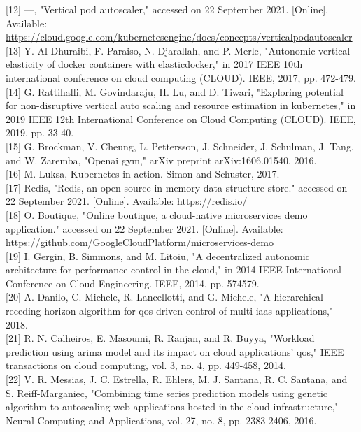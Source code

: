 \documentclass[10pt]{article}
\begin{document}
[12] —, "Vertical pod autoscaler," accessed on 22 September 2021. [Online]. Available: \href{https://cloud.google.com/kubernetesengine/docs/concepts/verticalpodautoscaler}{https://cloud.google.com/kubernetesengine/docs/concepts/verticalpodautoscaler}\\[0pt]
[13] Y. Al-Dhuraibi, F. Paraiso, N. Djarallah, and P. Merle, "Autonomic vertical elasticity of docker containers with elasticdocker," in 2017 IEEE 10th international conference on cloud computing (CLOUD). IEEE, 2017, pp. 472-479.\\[0pt]
[14] G. Rattihalli, M. Govindaraju, H. Lu, and D. Tiwari, "Exploring potential for non-disruptive vertical auto scaling and resource estimation in kubernetes," in 2019 IEEE 12th International Conference on Cloud Computing (CLOUD). IEEE, 2019, pp. 33-40.\\[0pt]
[15] G. Brockman, V. Cheung, L. Pettersson, J. Schneider, J. Schulman, J. Tang, and W. Zaremba, "Openai gym," arXiv preprint arXiv:1606.01540, 2016.\\[0pt]
[16] M. Luksa, Kubernetes in action. Simon and Schuster, 2017.\\[0pt]
[17] Redis, "Redis, an open source in-memory data structure store." accessed on 22 September 2021. [Online]. Available: \href{https://redis.io/}{https://redis.io/}\\[0pt]
[18] O. Boutique, "Online boutique, a cloud-native microservices demo application." accessed on 22 September 2021. [Online]. Available: \href{https://github.com/GoogleCloudPlatform/microservices-demo}{https://github.com/GoogleCloudPlatform/microservices-demo}\\[0pt]
[19] I. Gergin, B. Simmons, and M. Litoiu, "A decentralized autonomic architecture for performance control in the cloud," in 2014 IEEE International Conference on Cloud Engineering. IEEE, 2014, pp. 574579.\\[0pt]
[20] A. Danilo, C. Michele, R. Lancellotti, and G. Michele, "A hierarchical receding horizon algorithm for qos-driven control of multi-iaas applications," 2018.\\[0pt]
[21] R. N. Calheiros, E. Masoumi, R. Ranjan, and R. Buyya, "Workload prediction using arima model and its impact on cloud applications' qos," IEEE transactions on cloud computing, vol. 3, no. 4, pp. 449-458, 2014.\\[0pt]
[22] V. R. Messias, J. C. Estrella, R. Ehlers, M. J. Santana, R. C. Santana, and S. Reiff-Marganiec, "Combining time series prediction models using genetic algorithm to autoscaling web applications hosted in the cloud infrastructure," Neural Computing and Applications, vol. 27, no. 8, pp. 2383-2406, 2016.\\[0pt]
\end{document}
